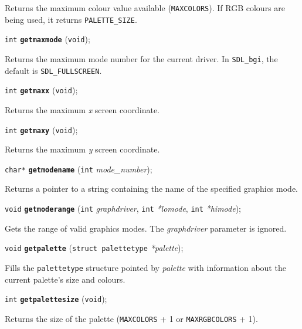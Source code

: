 \documentclass[a4paper,11pt]{article}
\newcommand{\SDLbgi}{\texttt{SDL\_bgi}}
\newcommand{\V}{\texttt{void}}      %
\newcommand{\I}{\texttt{int}}       %
\newcommand{\func}[1]{\textbf{\texttt{#1}}}  %
\newcommand{\A}[1]{\emph{#1}}       %
\newcommand{\T}[1]{\texttt{#1}}     %
\newenvironment{bgi}
{ %
  \begin{snugshade}
}
{ %
  \end{snugshade}
}
\begin{document}
Returns the maximum colour value available (\T{MAXCOLORS}). If RGB
colours are being used, it returns \T{PALETTE\_SIZE}.


\begin{bgi}
\I{} \func{getmaxmode} (\V{}); 
\end{bgi}

Returns the maximum mode number for the current driver. In \SDLbgi,
the default is \T{SDL\_FULLSCREEN}.


\begin{bgi}
\I{} \func{getmaxx} (\V{});
\end{bgi}

Returns the maximum \A{x} screen coordinate.


\begin{bgi}
\I{} \func{getmaxy} (\V{});
\end{bgi}

Returns the maximum \A{y} screen coordinate.


\begin{bgi}
\texttt{char*} \func{getmodename} (\I{} \A{mode\_number});
\end{bgi}

Returns a pointer to a string containing the name of the specified
graphics mode.


\begin{bgi}
\V{} \func{getmoderange} (\I{} \A{graphdriver}, \I{} \A{*lomode}, \I{}
\A{*himode});
\end{bgi}

Gets the range of valid graphics modes. The \A{graphdriver} parameter
is ignored.


\begin{bgi}
\V{} \func{getpalette} (\texttt{struct palettetype} \A{*palette});
\end{bgi}

Fills the \texttt{palettetype} structure pointed by \A{palette} with
information about the current palette's size and colours.


\begin{bgi}
\I{} \func{getpalettesize} (\V{}); 
\end{bgi}

Returns the size of the palette (\T{MAXCOLORS} + 1 or
\T{MAXRGB\-COLORS} + 1).
\end{document}
